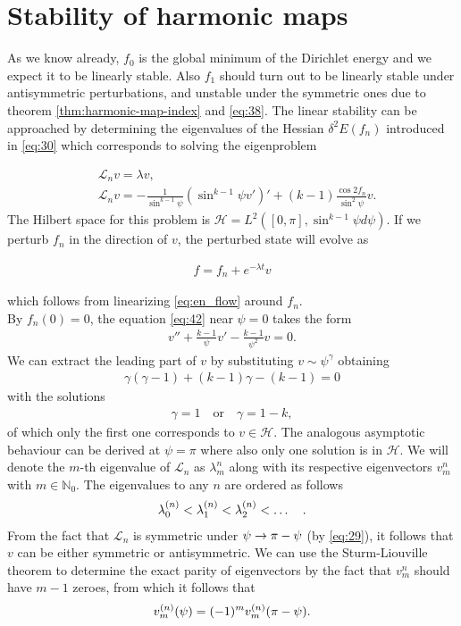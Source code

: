 \section{Stability of harmonic maps}
\label{sec:stab-ground-stat}

As we know already, $f_0$ is the global minimum of the Dirichlet
energy and we expect it to be linearly stable. Also $f_1$ should turn
out to be linearly stable under antisymmetric perturbations, and
unstable under the symmetric ones due to theorem
\ref{thm:harmonic-map-index} and \eqref{eq:38}. The linear stability
can be approached by determining the eigenvalues of the Hessian
$\delta^2E(f_n)$ introduced in \eqref{eq:30} which corresponds to
solving the eigenproblem

\begin{align}
  \label{eq:42}
  &\mathcal{L}_n v = \lambda v, \\
  \label{eq:43}
  &\mathcal{L}_n v = -\frac{1}{\sin^{k-1}\psi}\left(\sin^{k-1}\psi
      v'\right)'+(k-1)\frac{\cos2f_n}{\sin^2\psi}v.
\end{align}
The Hilbert space for this problem is
$\mathcal{H}=L^2([0,\pi],\sin^{k-1}\psi d\psi)$. If we perturb $f_n$
in the direction of $v$, the perturbed state will evolve as

\begin{align}
  \label{eq:44}
  f=f_n+e^{-\lambda t}v
\end{align}

which follows from linearizing \eqref{eq:en_flow} around $f_n$.\\

By $f_n(0)=0$, the equation \eqref{eq:42} near $\psi=0$ takes the form
\begin{align}
  \label{eq:45}
  v''+\frac{k-1}{\psi}v'-\frac{k-1}{\psi^2}v=0.
\end{align}
We can extract the leading part of $v$ by substituting
$v\sim\psi^\gamma$ obtaining
\begin{align}
  \label{eq:46}
  \gamma(\gamma-1)+(k-1)\gamma-(k-1)=0
\end{align}
with the solutions
\begin{align}
  \label{eq:47}
  \gamma=1\quad\text{or}\quad\gamma=1-k,
\end{align}
of which only the first one corresponds to $v\in\mathcal{H}$. The
analogous asymptotic behaviour can be derived at $\psi=\pi$ where also
only one solution is in $\mathcal{H}$. We will denote the $m$-th
eigenvalue of $\mathcal{L}_n$ as $\lambda_m^n$ along with its
respective eigenvectors $v_m^n$ with $m\in\mathbb{N}_0$. The
eigenvalues to any $n$ are ordered as follows
\begin{align}
  \label{eq:48}
  \lb{n}{0}<\lb{n}{1}<\lb{n}{2}<\dots\quad.
\end{align}
From the fact that $\mathcal{L}_n$ is symmetric under
$\psi\rightarrow\pi-\psi$ (by \eqref{eq:29}), it follows that $v$ can be
either symmetric or antisymmetric. We can use the Sturm-Liouville
theorem to determine the exact parity of eigenvectors by the fact that
$v_m^n$ should have $m-1$ zeroes, from which it follows that
\begin{align}
  \label{eq:49}
  \vn{m}{n}(\psi)=(-1)^m \vn{m}{n}(\pi-\psi).
\end{align}


